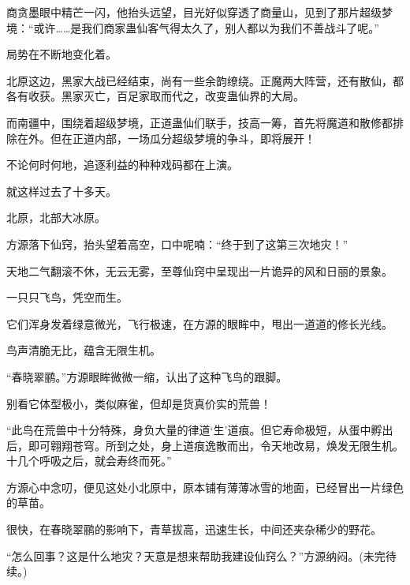 \begin{this_body}
商贪墨眼中精芒一闪，他抬头远望，目光好似穿透了商量山，见到了那片超级梦境：“或许……是我们商家蛊仙客气得太久了，别人都以为我们不善战斗了呢。”

局势在不断地变化着。

北原这边，黑家大战已经结束，尚有一些余韵缭绕。正魔两大阵营，还有散仙，都各有收获。黑家灭亡，百足家取而代之，改变蛊仙界的大局。

而南疆中，围绕着超级梦境，正道蛊仙们联手，技高一筹，首先将魔道和散修都排除在外。但在正道内部，一场瓜分超级梦境的争斗，即将展开！

不论何时何地，追逐利益的种种戏码都在上演。

就这样过去了十多天。

北原，北部大冰原。

方源落下仙窍，抬头望着高空，口中呢喃：“终于到了这第三次地灾！”

天地二气翻滚不休，无云无雾，至尊仙窍中呈现出一片诡异的风和日丽的景象。

一只只飞鸟，凭空而生。

它们浑身发着绿意微光，飞行极速，在方源的眼眸中，甩出一道道的修长光线。

鸟声清脆无比，蕴含无限生机。

“春晓翠鹂。”方源眼眸微微一缩，认出了这种飞鸟的跟脚。

别看它体型极小，类似麻雀，但却是货真价实的荒兽！

“此鸟在荒兽中十分特殊，身负大量的律道‘生’道痕。但它寿命极短，从蛋中孵出后，即可翱翔苍穹。所到之处，身上道痕逸散而出，令天地改易，焕发无限生机。十几个呼吸之后，就会寿终而死。”

方源心中念叨，便见这处小北原中，原本铺有薄薄冰雪的地面，已经冒出一片绿色的草苗。

很快，在春晓翠鹂的影响下，青草拔高，迅速生长，中间还夹杂稀少的野花。

“怎么回事？这是什么地灾？天意是想来帮助我建设仙窍么？”方源纳闷。(未完待续。)

\end{this_body}

